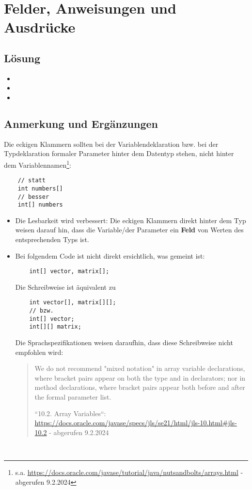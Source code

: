 \chapter{Felder, Anweisungen und Ausdrücke}

\section{Lösung}

\begin{itemize}
    \item {}
    \item {}
    \item {}
\end{itemize}

\section{Anmerkung und Ergänzungen}

Die eckigen Klammern sollten bei der Variablendeklaration {bzw.} bei der Typdeklaration formaler Parameter hinter dem Datentyp stehen, nicht hinter dem Variablennamen\footnote{
    s.a. \url{https://docs.oracle.com/javase/tutorial/java/nutsandbolts/arrays.html} - abgerufen 9.2.2024}:

\begin{verbatim}
    // statt
    int numbers[]
    // besser
    int[] numbers
\end{verbatim}

\begin{itemize}
    \item Die Lesbarkeit wird verbessert: Die eckigen Klammern direkt hinter dem Typ weisen darauf hin, dass die Variable/der Parameter ein \textbf{Feld} von Werten des entsprechenden Typs ist.
    \item Bei folgendem Code ist nicht direkt ersichtlich, was gemeint ist:
    \begin{verbatim}
    int[] vector, matrix[];
    \end{verbatim}
    Die Schreibweise ist äquivalent zu
    \begin{verbatim}
    int vector[], matrix[][];
    // bzw.
    int[] vector;
    int[][] matrix;
    \end{verbatim}
    Die Sprachspezifikationen weisen daraufhin, dass diese Schreibweise nicht empfohlen wird:
    \blockquote[{``10.2. Array Variables``: \url{https://docs.oracle.com/javase/specs/jls/se21/html/jls-10.html#jls-10.2} - abgerufen 9.2.2024}]{
        We do not recommend "mixed notation" in array variable declarations, where bracket pairs appear on both the type and in declarators; nor in method declarations, where bracket pairs appear both before and after the formal parameter list.
    }
\end{itemize}\\

